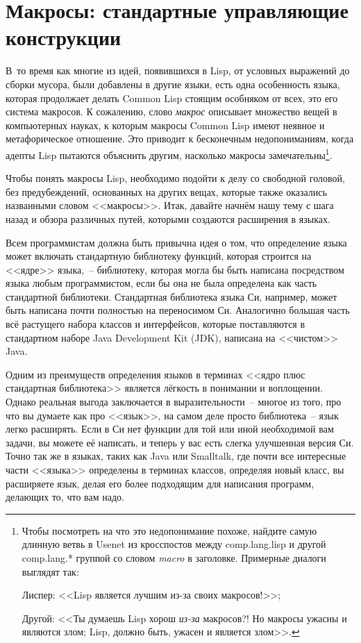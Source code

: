 \chapter{Макросы: стандартные управляющие конструкции}
\label{ch:07}

\thispagestyle{empty}

В~то время как многие из идей, появившихся в Lisp, от условных выражений до сборки
мусора, были добавлены в другие языки, есть одна особенность языка, которая продолжает
делать Common Lisp стоящим особняком от всех, это его система макросов. К сожалению, слово
\textit{макрос} описывает множество вещей в компьютерных науках, к которым макросы Common Lisp
имеют неявное и метафорическое отношение. Это приводит к бесконечным недопониманиям,
когда адепты Lisp пытаются объяснить другим, насколько макросы
замечательны\footnote{Чтобы посмотреть на что это недопонимание похоже, найдите самую
  длинную ветвь в Usenet из кросспостов между comp.lang.lisp и другой comp.lang.* группой
  со словом \textit{macro} в заголовке. Примерные диалоги выглядят так:

Лиспер: <<Lisp является лучшим из-за своих макросов!>>;

Другой: <<Ты думаешь Lisp хорош \textit{из-за} макросов?! Но макросы ужасны и являются
злом; Lisp, должно быть, ужасен и является злом>>.}.

Чтобы понять макросы Lisp, необходимо подойти к делу со свободной головой, без
предубеждений, основанных на других вещах, которые также оказались названными словом
<<макросы>>. Итак, давайте начнём нашу тему с шага назад и обзора различных путей, которыми
создаются расширения в языках.

Всем программистам должна быть привычна идея о том, что определение языка может включать
стандартную библиотеку функций, которая строится на <<ядре>> языка,~-- библиотеку, которая
могла бы быть написана посредством языка любым прог\-рам\-мис\-том, если бы она не была
определена как часть стандартной библиотеки. Стандартная библиотека языка Си, например,
может быть написана почти полностью на переносимом Си. Аналогично большая часть всё
растущего набора классов и интерфейсов, которые поставляются в стандартном наборе Java
Development Kit (JDK), написана на <<чистом>> Java.

Одним из преимуществ определения языков в терминах <<ядро плюс стандартная библиотека>> является
лёгкость в понимании и воплощении. Однако реальная выгода заключается в выразительности~--
многое из того, про что вы думаете как про <<язык>>, на самом деле просто библиотека~-- язык
легко расширять. Если в Си нет функции для той или иной необходимой вам задачи, вы можете
её написать, и теперь у вас есть слегка улучшенная версия Си. Точно так же в языках, таких
как Java или Smalltalk, где почти все интересные части <<языка>> определены в терминах
классов, определяя новый класс, вы расширяете язык, делая его более подходящим для
написания программ, делающих то, что вам надо.

